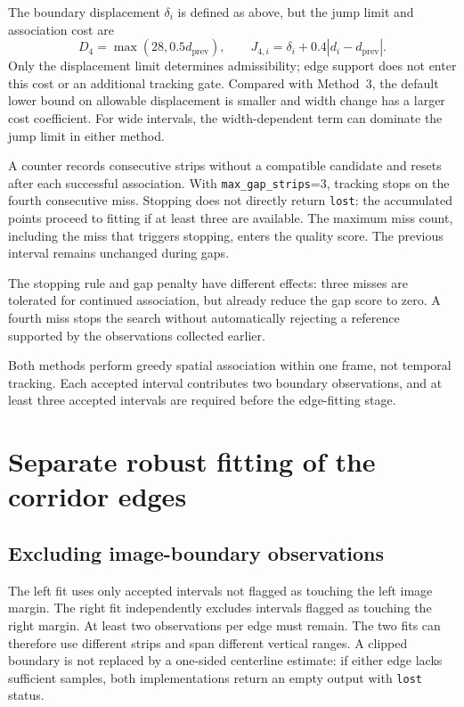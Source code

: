 The boundary displacement $\delta_i$ is defined as above, but the jump
limit and association cost are
\begin{equation}
    D_4=\max(28,0.5d_{\mathrm{prev}}),\qquad
    J_{4,i}=\delta_i+0.4|d_i-d_{\mathrm{prev}}|.
    \label{eq:c4_cost4}
\end{equation}
Only the displacement limit determines admissibility; edge support does
not enter this cost or an additional tracking gate. Compared with
Method~3, the default lower bound on allowable displacement is smaller
and width change has a larger cost coefficient. For wide intervals,
the width-dependent term can dominate the jump limit in either method.

A counter records consecutive strips without a compatible candidate and
resets after each successful association. With
\texttt{max\_gap\_strips}=3, tracking stops on the fourth consecutive
miss. Stopping does not directly return \texttt{lost}: the accumulated
points proceed to fitting if at least three are available. The maximum
miss count, including the miss that triggers stopping, enters the quality
score. The previous interval remains unchanged during gaps.

The stopping rule and gap penalty have different effects: three misses
are tolerated for continued association, but already reduce the gap
score to zero. A fourth miss stops the search without automatically
rejecting a reference supported by the observations collected earlier.

Both methods perform greedy spatial association within one frame, not
temporal tracking. Each accepted interval contributes two boundary
observations, and at least three accepted intervals are required before
the edge-fitting stage.

\section{Separate robust fitting of the corridor edges}
\label{sec:c4_fitting}

\subsection{Excluding image-boundary observations}
\label{subsec:c4_edge_samples}

The left fit uses only accepted intervals not flagged as touching the
left image margin. The right fit independently excludes intervals
flagged as touching the right margin. At least two observations per edge
must remain. The two fits can therefore use different strips and span
different vertical ranges. A clipped boundary is not replaced by a
one-sided centerline estimate: if either edge lacks sufficient samples,
both implementations return an empty output with \texttt{lost} status.


